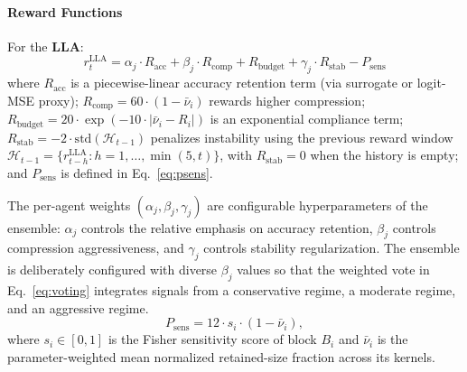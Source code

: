 \documentclass[preprint,12pt,authoryear]{elsarticle}
\begin{document}
\paragraph{Reward Functions}
For the \textbf{LLA}:
\begin{equation}
    r_t^{\mathrm{LLA}} = \alpha_j \cdot R_{\mathrm{acc}}
        + \beta_j  \cdot R_{\mathrm{comp}}
        + R_{\mathrm{budget}}
        + \gamma_j \cdot R_{\mathrm{stab}}
        - P_{\mathrm{sens}}
    \label{eq:lla_reward}
\end{equation}
where $R_{\mathrm{acc}}$ is a piecewise-linear accuracy retention term (via
surrogate or logit-MSE proxy); $R_{\mathrm{comp}} = 60\cdot(1 - \bar{\nu}_i)$ rewards
higher compression; $R_{\mathrm{budget}} = 20\cdot\exp(-10\cdot|\bar{\nu}_i - R_i|)$
is an exponential compliance term; $R_{\mathrm{stab}} = -2\cdot\mathrm{std}(\mathcal{H}_{t-1})$
penalizes instability using the previous reward window
$\mathcal{H}_{t-1}=\{r_{t-h}^{\mathrm{LLA}}:h=1,\ldots,\min(5,t)\}$, with
$R_{\mathrm{stab}}=0$ when the history is empty; and $P_{\mathrm{sens}}$ is defined in
Eq.~\eqref{eq:psens}.

The per-agent weights $(\alpha_j, \beta_j, \gamma_j)$ are configurable hyperparameters
of the ensemble: $\alpha_j$ controls the relative emphasis on accuracy retention,
$\beta_j$ controls compression aggressiveness, and $\gamma_j$ controls stability
regularization. The ensemble is deliberately configured with diverse $\beta_j$ values so
that the weighted vote in Eq.~\eqref{eq:voting} integrates signals from a conservative
regime, a moderate regime, and an aggressive regime.
\begin{equation}
    P_{\mathrm{sens}} = 12 \cdot s_i \cdot (1 - \bar{\nu}_i),
    \label{eq:psens}
\end{equation}
where $s_i \in [0,1]$ is the Fisher sensitivity score of block $B_i$ and
$\bar{\nu}_i$ is the parameter-weighted mean normalized retained-size fraction across its kernels.
\end{document}
